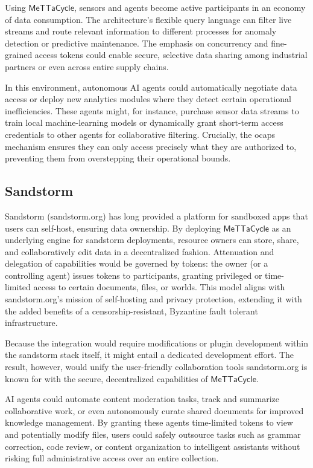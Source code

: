 \documentclass{article}
\newcommand{\MC}{\mathsf{MeTTaCycle}}
\begin{document}
Using $\MC$, sensors and agents become active participants in an economy of data consumption. The architecture’s flexible query language can filter live streams and route relevant information to different processes for anomaly detection or predictive maintenance. The emphasis on concurrency and fine-grained access tokens could enable secure, selective data sharing among industrial partners or even across entire supply chains.

In this environment, autonomous AI agents could automatically negotiate data access or deploy new analytics modules where they detect certain operational inefficiencies. These agents might, for instance, purchase sensor data streams to train local machine-learning models or dynamically grant short-term access credentials to other agents for collaborative filtering. Crucially, the ocaps mechanism ensures they can only access precisely what they are authorized to, preventing them from overstepping their operational bounds.

\subsection{Sandstorm}

Sandstorm (sandstorm.org) has long provided a platform for sandboxed apps that users can self-host, ensuring data ownership. By deploying $\MC$ as an underlying engine for sandstorm deployments, resource owners can store, share, and collaboratively edit data in a decentralized fashion. Attenuation and delegation of capabilities would be governed by tokens: the owner (or a controlling agent) issues tokens to participants, granting privileged or time-limited access to certain documents, files, or worlds. This model aligns with sandstorm.org’s mission of self-hosting and privacy protection, extending it with the added benefits of a censorship-resistant, Byzantine fault tolerant infrastructure.

Because the integration would require modifications or plugin development within the sandstorm stack itself, it might entail a dedicated development effort. The result, however, would unify the user-friendly collaboration tools sandstorm.org is known for with the secure, decentralized capabilities of $\MC$.

AI agents could automate content moderation tasks, track and summarize collaborative work, or even autonomously curate shared documents for improved knowledge management. By granting these agents time-limited tokens to view and potentially modify files, users could safely outsource tasks such as grammar correction, code review, or content organization to intelligent assistants without risking full administrative access over an entire collection.
\end{document}
